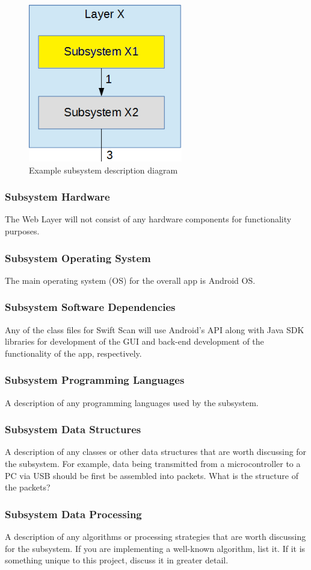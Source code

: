 \begin{figure}[h!]
	\centering
 	\includegraphics[width=0.60\textwidth]{images/subsystem}
 \caption{Example subsystem description diagram}
\end{figure}

\subsubsection{Subsystem Hardware}
The Web Layer will not consist of any hardware components for functionality purposes.

\subsubsection{Subsystem Operating System}
The main operating system (OS) for the overall app is Android OS.

\subsubsection{Subsystem Software Dependencies}
Any of the class files for Swift Scan will use Android's API along with Java SDK libraries for development of the GUI and back-end development of the functionality of the app, respectively.

\subsubsection{Subsystem Programming Languages}
A description of any programming languages used by the subsystem.

\subsubsection{Subsystem Data Structures}
A description of any classes or other data structures that are worth discussing for the subsystem. For example, data being transmitted from a microcontroller to a PC via USB should be first be assembled into packets. What is the structure of the packets?

\subsubsection{Subsystem Data Processing}
A description of any algorithms or processing strategies that are worth discussing for the subsystem. If you are implementing a well-known algorithm, list it. If it is something unique to this project, discuss it in greater detail.


